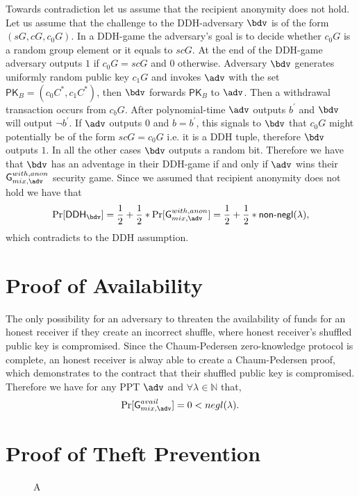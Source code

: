 \documentclass[a4paper,UKenglish,cleveref, autoref]{oasics-v2019}
\begin{document}
\begin{appendices}
	Towards contradiction let us assume that the recipient anonymity does not hold. Let us assume that the challenge to the DDH-adversary $\bdv$ is of the form $(sG,cG,c_{0}G)$. In a DDH-game the adversary's goal is to decide whether $c_{0}G$ is a random group element or it equals to $scG$. At the end of the DDH-game adversary outputs $1$ if $c_{0}G=scG$ and $0$ otherwise.  Adversary $\bdv$ generates uniformly random public key $c_{1}G$ and invokes $\adv$ with the set $\textsf{PK}_{B}=(c_{0}C^{*}, c_{1}C^{*})$, then $\bdv$ forwards $\textsf{PK}_{B}$ to $\adv$. Then a withdrawal transaction occurs from $c_{b}G$. After polynomial-time $\adv$ outputs $b^{'}$ and $\bdv$ will output $\lnot b^{'}$. If $\adv$ outputs $0$ and $b=b^{'}$, this signals to $\bdv$ that $c_{0}G$ might potentially be of the form $scG=c_{0}G$  i.e. it is a DDH tuple, therefore $\bdv$ outputs $1$. In all the other cases $\bdv$ outputs a random bit. Therefore we have that $\bdv$ has an adventage in their DDH-game if and only if $\adv$ wins their $\textsf{G}^{with, anon}_{mix, \adv}$ security game. Since we assumed that recipient anonymity does not hold we have that $$\Pr[\textsf{DDH}_{\bdv}]=\frac{1}{2}+\frac{1}{2}*\Pr[\textsf{G}^{with, anon}_{mix, \adv}]=\frac{1}{2}+\frac{1}{2}*\textsf{non-negl}(\lambda),$$ which contradicts to the DDH assumption.
	
	\section{Proof of Availability}  \label{appendavail}
	
	The only possibility for an adversary to threaten the availability of funds for an honest receiver if they create an incorrect shuffle, where honest receiver's shuffled public key is compromised. Since the Chaum-Pedersen zero-knowledge protocol is complete, an honest receiver is alway able to create a Chaum-Pedersen proof, which demonstrates to the contract that their shuffled public key is compromised. Therefore we have for any PPT $\adv$ and $\forall \lambda \in \mathbb{N}$ that, $$\Pr[\textsf{G}^{avail}_{mix, \adv}]=0<negl(\lambda).$$
	
	\section{Proof of Theft Prevention} \label{appendtheft}
	
	\begin{wrapfigure}{r}{0.5\textwidth}
		\centering
		\begin{bbrenv}{A}
			\begin{bbrbox} [name=\bdv]
				

\end{bbrbox}
\end{bbrenv}
\end{wrapfigure}
\end{appendices}
\end{document}
